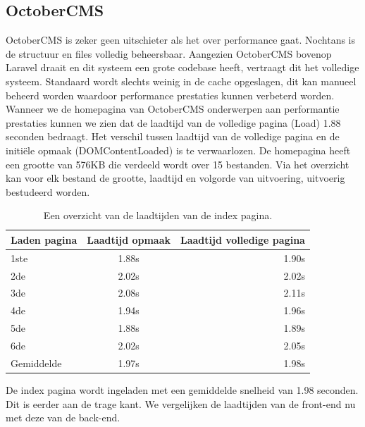 \pagebreak


\subsection{OctoberCMS}
OctoberCMS is zeker geen uitschieter als het over performance gaat. Nochtans is de structuur en files volledig beheersbaar. Aangezien OctoberCMS bovenop Laravel draait en dit systeem een grote codebase heeft, vertraagt dit het volledige systeem. Standaard wordt slechts weinig in de cache opgeslagen, dit kan manueel beheerd worden waardoor performance prestaties kunnen verbeterd worden.
\newline\newline
Wanneer we de homepagina van OctoberCMS onderwerpen aan performantie prestaties kunnen we zien dat de laadtijd van de volledige pagina (Load) 1.88 seconden bedraagt. Het verschil tussen laadtijd van de volledige pagina en de initiële opmaak (DOMContentLoaded) is te verwaarlozen. De homepagina heeft een grootte van 576KB die verdeeld wordt over 15 bestanden. Via het overzicht kan voor elk bestand de grootte, laadtijd en volgorde van uitvoering, uitvoerig bestudeerd worden.

\begin{table}[!ht]
\centering
\begin{tabular}{|l|c|r|}
    \hline
    Laden pagina & Laadtijd opmaak & Laadtijd volledige pagina\\
    \hline
    1ste & 1.88s & 1.90s\\
    \hline
    2de & 2.02s & 2.02s\\
    \hline
    3de & 2.08s & 2.11s\\
    \hline
    4de & 1.94s & 1.96s\\
    \hline
    5de & 1.88s & 1.89s\\
     \hline
    6de & 2.02s & 2.05s\\
    \hline
    Gemiddelde & 1.97s & 1.98s\\
    \hline
\end{tabular}
\caption{\label{tab:OctoberCMS resultaten performantie front-end } Een overzicht van de laadtijden van de index pagina.}
\end{table}

\noindent
De index pagina wordt ingeladen met een gemiddelde snelheid van 1.98 seconden. Dit is eerder aan de trage kant. We vergelijken de laadtijden van de front-end nu met deze van de back-end.

